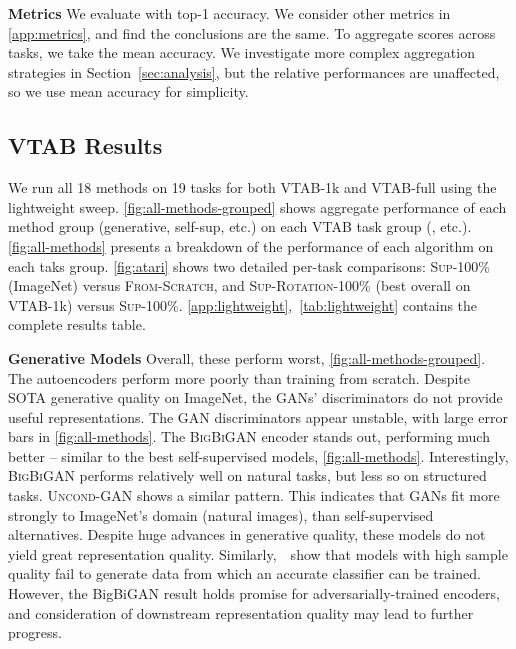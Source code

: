 \textbf{Metrics}\quad
We evaluate with top-1 accuracy. We consider other metrics in \ref{app:metrics}, and find the conclusions are the same. To aggregate scores across tasks, we take the mean accuracy. We investigate more complex aggregation strategies in Section~\ref{sec:analysis}, but the relative performances are unaffected, so we use mean accuracy for simplicity.

\subsection{VTAB Results}

We run all 18 methods on 19 tasks for both VTAB-1k and VTAB-full using the lightweight sweep.
\ref{fig:all-methods-grouped} shows aggregate performance of each method group (generative, self-sup, etc.) on each VTAB task group (\taskNatural{}, etc.).
\ref{fig:all-methods} presents a breakdown of the performance of each algorithm on each taks group.
\ref{fig:atari} shows two detailed per-task comparisons:
\textsc{Sup-100\%} (ImageNet) versus \textsc{From-Scratch}, and
\textsc{Sup-Rotation-100\%} (best overall on VTAB-1k) versus \textsc{Sup-100\%}.
\ref{app:lightweight},~\ref{tab:lightweight} contains the complete results table.

\textbf{Generative Models}\quad
Overall, these perform worst, \ref{fig:all-methods-grouped}.
The autoencoders perform more poorly than training from scratch. Despite SOTA generative quality on ImageNet, the GANs' discriminators do not provide useful representations. The GAN discriminators appear unstable, with large error bars in \ref{fig:all-methods}.
The \textsc{BigBiGAN} encoder stands out, performing much better -- similar to the best self-supervised models, \ref{fig:all-methods}.
Interestingly, \textsc{BigBiGAN} performs relatively well on natural tasks, but less so on structured tasks.
\textsc{Uncond-GAN} shows a similar pattern. This indicates that GANs fit more strongly to ImageNet's domain (natural images), than self-supervised alternatives. Despite huge advances in generative quality, these models do not yield great representation quality.
Similarly,~\citet{ravuri2019classification}~show that models with high sample quality fail to generate data from which an accurate classifier can be trained. However, the BigBiGAN result holds promise for adversarially-trained encoders, and consideration of downstream representation quality may lead to further progress.

